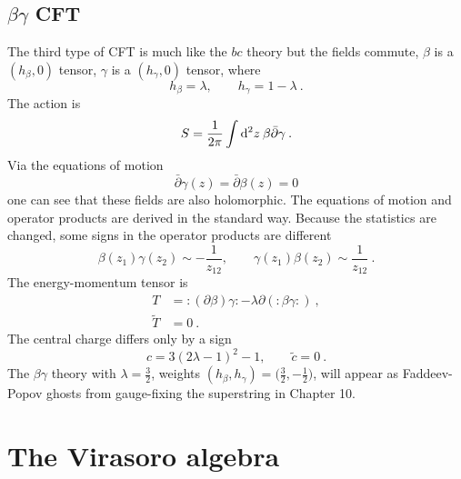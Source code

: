 \subsection*{$\beta\gamma$ CFT}
The third type of CFT is much like the $bc$ theory but the fields commute, $\beta$ is a $(h_{\beta}, 0)$ tensor, $\gamma$ is a $(h_{\gamma}, 0)$ tensor, where    
\begin{equation}
	h_{\beta}=\lambda, \qquad h_{\gamma}=1-\lambda \:.
	\label{2.5.19}
\end{equation}
The action is    
\begin{equation}
	S=\frac{1}{2 \pi} \int \mathrm{d}^{2} z \: \beta \bar{\partial} \gamma \:. \label{2.5.20}
\end{equation}
Via the equations of motion    
\begin{equation}
	\bar{\partial} \gamma(z)=\bar{\partial} \beta(z)=0
\end{equation}
one can see that these fields are also holomorphic. The equations of motion and operator products are derived in the standard way.    
Because the statistics are changed, some signs in the operator products are different    
\begin{equation}
	\beta(z_{1}) \gamma(z_{2}) \sim-\frac{1}{z_{12}}, \qquad \gamma(z_{1}) \beta(z_{2}) \sim \frac{1}{z_{12}} \:. \label{2.5.22}
\end{equation}
The energy-momentum tensor is    
\begin{subequations} \label{2.5.23}
	\begin{align}
		T&=:\mathrel{(\partial \beta) \gamma}:-\lambda \partial(:\mathrel{\beta \gamma}:) \:, \label{2.5.23a} \\
		\tilde{T}&=0 \:.
		\label{2.5.23b}
	\end{align} 
\end{subequations}
The central charge differs only by a sign    
\begin{equation}
	c=3(2 \lambda-1)^{2}-1, \qquad \tilde{c}=0 \:.
\end{equation}
The $\beta\gamma$ theory with $\lambda=\frac{3}{2}$, weights $(h_{\beta}, h_{\gamma})=\bigl(\tfrac{3}{2},-\tfrac{1}{2}\bigr)$, will appear as Faddeev-Popov ghosts from gauge-fixing the superstring in Chapter 10.    

\section{\texorpdfstring{The Virasoro algebra}{2.6 The Virasoro algebra}}

